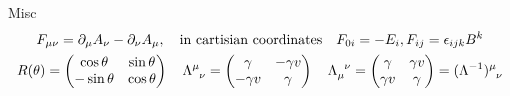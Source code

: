 \documentclass{article}
\begin{document}
Misc
\begin{gather}
    F_{\mu\nu} = \partial_\mu A_\nu - \partial_{\nu}A_\mu,\qq{in cartisian coordinates} F_{0i} = -E_i, F_{ij} = \epsilon_{ijk}B^{k}\\
    R(\theta) = \mqty(\cos\theta & \sin\theta \\ -\sin\theta & \cos\theta)\,\quad \Lambda\indices{^{\mu}_\nu} = \mqty(\gamma & -\gamma v \\ -\gamma v & \gamma)\,\quad
    \Lambda\indices{_{\mu}^\nu} = \mqty(\gamma & \gamma v \\ \gamma v & \gamma) = (\Lambda^{-1})\indices{^{\mu}_\nu}
\end{gather}
\end{document}
